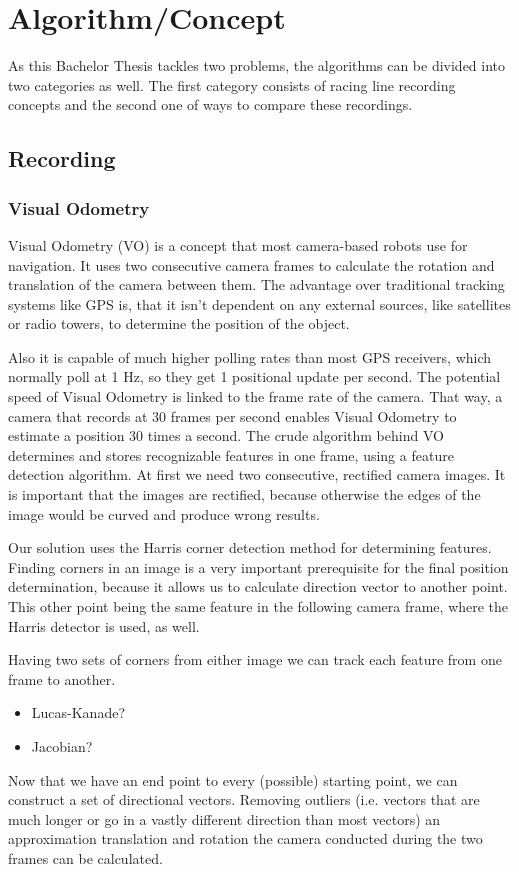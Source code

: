 \section{Algorithm/Concept}
\label{sec:algorithm}
\graphicspath{{utils/}}
As this Bachelor Thesis tackles two problems, the algorithms can be divided into two categories as well.
The first category consists of racing line recording concepts and the second one of ways to compare these recordings.

\subsection{Recording}
\subsubsection{Visual Odometry}
\label{subsec:vo}
Visual Odometry (VO) is a concept that most camera-based robots use for navigation. It uses two consecutive camera frames to calculate the rotation and translation of the camera between them. The advantage over traditional tracking systems like GPS is, that it isn't dependent on any external sources, like satellites or radio towers, to determine the position of the object.

Also it is capable of much higher polling rates than most GPS receivers, which normally poll at 1 Hz, so they get 1 positional update per second. The potential speed of Visual Odometry is linked to the frame rate of the camera. That way, a camera that records at 30 frames per second enables Visual Odometry to estimate a position 30 times a second. 
The crude algorithm behind VO determines and stores recognizable features in one frame, using a feature detection algorithm.
At first we need two consecutive, rectified camera images. It is important that the images are rectified, because otherwise the edges of the image would be curved and produce wrong results.

Our solution uses the Harris corner detection method for determining features. Finding corners in an image is a very important prerequisite for the final position determination, because it allows us to calculate direction vector to another point. This other point being the same feature in the following camera frame, where the Harris detector is used, as well.

Having two sets of corners from either image we can track each feature from one frame to another. 
\begin{itemize}
    \item Lucas-Kanade?
    \item Jacobian?
\end{itemize}
Now that we have an end point to every (possible) starting point, we can construct a set of directional vectors.
Removing outliers (i.e. vectors that are much longer or go in a vastly different direction than most vectors) an approximation translation and rotation the camera conducted during the two frames can be calculated.

